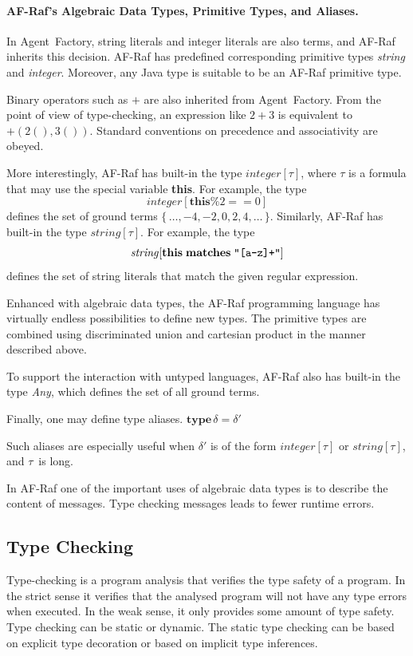 \documentclass[a4paper,12pt,oneside,fleqn]{book} %
\newcommand{\todo}[1]{[\textcolor{red}{TODO}: #1]}
\begin{document}
\paragraph{AF-Raf's Algebraic Data Types, Primitive Types, and Aliases.}
In Agent~Factory, string literals and integer literals are
also terms, and AF-Raf inherits this decision. AF-Raf has
predefined corresponding primitive types \textit{string} and
\textit{integer}. Moreover, any Java type is suitable to be an AF-Raf
primitive type.

Binary operators such as $+$ are also inherited from Agent~Factory. From
the point of view of type-checking, an expression like $2+3$ is equivalent
to $+(2(),3())$. Standard conventions on precedence and associativity are
obeyed.

More interestingly, AF-Raf has built-in the type $\mathit{integer}[\tau]$,
where $\tau$ is a formula that may use the special variable \textbf{this}.
For example, the type \[\mathit{integer}[\mathbf{this}\%2==0]\] defines the
set of ground terms $\{\,\ldots,-4,-2,0,2,4,\ldots\,\}$. Similarly, AF-Raf
has built-in the type $\mathit{string}[\tau]$. For example, the type
\[\mathit{string}[\mathbf{this}\;\mathbf{matches}\;\verb|"[a-z]+"|]\]
defines the set of string literals that match the given regular expression.

Enhanced with algebraic data types, the AF-Raf programming language has
virtually endless possibilities to define new types. The primitive types
are combined using discriminated union and cartesian product in the manner
described above.

To support the interaction with untyped languages, AF-Raf also has built-in
the type \textit{Any}, which defines the set of all ground terms.

Finally, one may define type aliases.
$\mathbf{type}\,\delta=\delta'$

Such aliases are especially useful when $\delta'$ is of the form
$\mathit{integer}[\tau]$ or $\mathit{string}[\tau]$, and $\tau$~is long.


In AF-Raf one of the important uses of algebraic data types is to describe
the content of messages. Type checking messages leads to fewer runtime
errors.

\subsection{Type Checking}\label{sec:concepts-adt-check} %
Type-checking is a program analysis that verifies the type safety of a
program. In the strict sense it verifies that the analysed program
will not have any type errors when executed. In the weak sense, it only
provides some amount of type safety. Type checking can be static or
dynamic. The static type checking can be based on explicit type decoration
or based on implicit type inferences.
\end{document}
